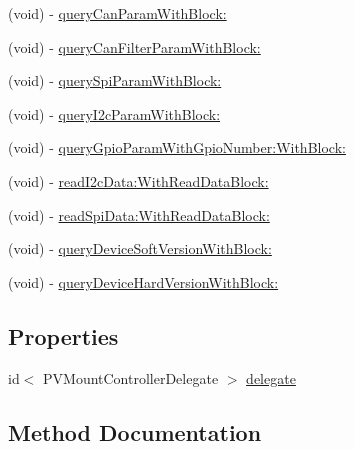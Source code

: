 \begin{DoxyCompactItemize}
\item 
(void) -\/ \hyperlink{interface_p_v_mount_controller_a140de4207e581aa211dfa69e1aeaee16}{query\+Can\+Param\+With\+Block\+:}
\item 
(void) -\/ \hyperlink{interface_p_v_mount_controller_ab831b53729929aab50c09bee7d482e46}{query\+Can\+Filter\+Param\+With\+Block\+:}
\item 
(void) -\/ \hyperlink{interface_p_v_mount_controller_ae220babadb47279f451b443192f7c0d2}{query\+Spi\+Param\+With\+Block\+:}
\item 
(void) -\/ \hyperlink{interface_p_v_mount_controller_a8d3a80dc85723aa615212453f60c04d1}{query\+I2c\+Param\+With\+Block\+:}
\item 
(void) -\/ \hyperlink{interface_p_v_mount_controller_a08d38f3bfb4a776cf1d9789023cc72e2}{query\+Gpio\+Param\+With\+Gpio\+Number\+:\+With\+Block\+:}
\item 
(void) -\/ \hyperlink{interface_p_v_mount_controller_a0972ee41c4633fa827ac26a021f911b9}{read\+I2c\+Data\+:\+With\+Read\+Data\+Block\+:}
\item 
(void) -\/ \hyperlink{interface_p_v_mount_controller_ad8b9eaddc70538943db4cb59fda3593b}{read\+Spi\+Data\+:\+With\+Read\+Data\+Block\+:}
\item 
(void) -\/ \hyperlink{interface_p_v_mount_controller_ab0c44814e085926888a9bf3d592bc7f1}{query\+Device\+Soft\+Version\+With\+Block\+:}
\item 
(void) -\/ \hyperlink{interface_p_v_mount_controller_a6b71e325eb6505c4e3152209770edabe}{query\+Device\+Hard\+Version\+With\+Block\+:}
\end{DoxyCompactItemize}
\subsection*{Properties}
\begin{DoxyCompactItemize}
\item 
id$<$ P\+V\+Mount\+Controller\+Delegate $>$ \hyperlink{interface_p_v_mount_controller_a9d39427327fcf8a97a334c4c79e41f6b}{delegate}
\end{DoxyCompactItemize}


\subsection{Method Documentation}
\mbox{\label{interface_p_v_mount_controller_aa012204d433eb9b285031bfa90259ae3}} 
